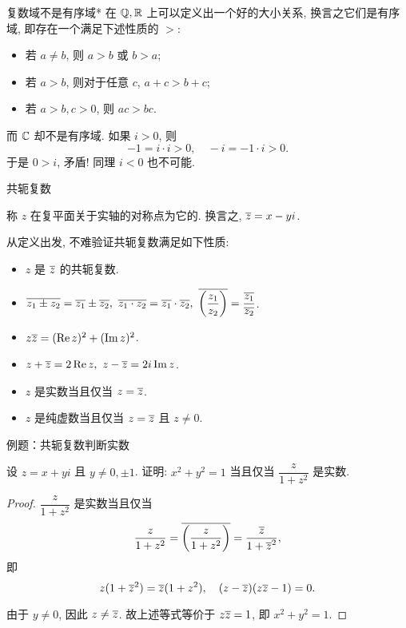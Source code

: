\begin{frame}{复数域不是有序域*}
\onslide<+->
在 ${\mathbb{Q}},{\mathbb{R}}$ 上可以定义出一个好的大小关系,
\onslide<+->
换言之它们是有序域, 即存在一个满足下述性质的 $>$:
\begin{itemize}
\item 若 $a\neq b$, 则 $a>b$ 或 $b>a$;
\item 若 $a>b$, 则对于任意 $c$, $a+c>b+c$;
\item 若 $a>b,c>0$, 则 $ac>bc$.
\end{itemize}

\onslide<+->
而 ${\mathbb{C}}$ 却不是有序域.
\onslide<+->
如果 $i>0$, 则
\[-1=i\cdot i>0,\quad -i=-1\cdot i>0.\]
\onslide<+->
于是 $0>i$, 矛盾! 同理 $i<0$ 也不可能.
\end{frame}


\begin{frame}{共轭复数}
\begin{definition}
称 $z$ 在复平面关于实轴的对称点为它的.
换言之, $\overline z=x-yi$.
\end{definition}
\onslide<+->
从定义出发, 不难验证共轭复数满足如下性质:
\begin{conclusion}[共轭复数性质汇总]
\begin{itemize}
\item $z$ 是 $\overline z$ 的共轭复数.
\item $\ov{z_1\pm z_2}=\ov{z_1}\pm\ov{z_2},\ 
\ov{z_1\cdot z_2}=\ov{z_1}\cdot\ov{z_2},\ 
\ov{\left(\dfrac{z_1}{z_2}\right)}=\dfrac{\ov{z_1}}{\ov{z_2}}$.
\item $z\overline{z}=(\operatorname{Re} z)^2+(\operatorname{Im} z)^2$.
\item $z+\overline z=2\operatorname{Re} z,\ z-\overline z=2i\operatorname{Im} z$.
\item $z$ 是实数当且仅当 $z=\overline z$.
\item $z$ 是纯虚数当且仅当 $z=\overline z$ 且 $z\neq 0$.
\end{itemize}
\end{conclusion}
\end{frame}


\begin{frame}{例题：共轭复数判断实数}
\begin{example}
设 $z=x+yi$ 且 $y\neq 0,\pm1$. 证明: $x^2+y^2=1$ 当且仅当 $\dfrac z{1+z^2}$ 是实数.
\end{example}
\begin{proof}
\indent
$\dfrac z{1+z^2}$ 是实数当且仅当
\[\frac z{1+z^2}=\overline{\left(\frac z{1+z^2}\right)}=\frac{\overline z}{1+{\overline z}^2},\]
\onslide<+->
即
\vspace{-\baselineskip}
\[z(1+{\overline z}^2)=\overline z(1+z^2),\quad (z-\overline z)(z\overline z-1)=0.\]

\onslide<+->
\indent
由于 $y\neq0$, 因此 $z\neq \overline z$.
\onslide<+->
故上述等式等价于 $z\overline z=1$, 即 $x^2+y^2=1$.
\end{proof}
\end{frame}


